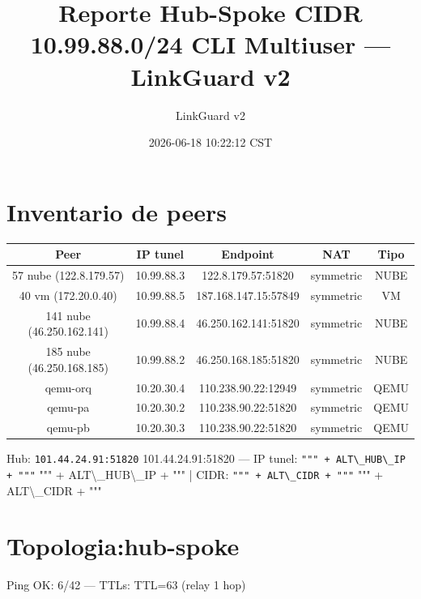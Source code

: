 \documentclass[11pt,a4paper]{article}
\title{Reporte Hub-Spoke CIDR 10.99.88.0/24 CLI Multiuser — LinkGuard v2}
\author{LinkGuard v2}
\date{2026-06-18 10:22:12 CST}
\begin{document}
\maketitle

\section{Inventario de peers}
\begin{longtable}{|c|c|c|c|c|}
\hline
Peer & IP tunel & Endpoint & NAT & Tipo \\ \hline
57 nube (122.8.179.57) & 10.99.88.3 & 122.8.179.57:51820 & symmetric & NUBE \\ \hline
40 vm (172.20.0.40) & 10.99.88.5 & 187.168.147.15:57849 & symmetric & VM \\ \hline
141 nube (46.250.162.141) & 10.99.88.4 & 46.250.162.141:51820 & symmetric & NUBE \\ \hline
185 nube (46.250.168.185) & 10.99.88.2 & 46.250.168.185:51820 & symmetric & NUBE \\ \hline
qemu-orq & 10.20.30.4 & 110.238.90.22:12949 & symmetric & QEMU \\ \hline
qemu-pa & 10.20.30.2 & 110.238.90.22:51820 & symmetric & QEMU \\ \hline
qemu-pb & 10.20.30.3 & 110.238.90.22:51820 & symmetric & QEMU \\ \hline
\end{longtable}

Hub:  \texttt{101.44.24.91:51820} 101.44.24.91:51820  — IP tunel:  \texttt{""" + ALT\textbackslash{}_HUB\textbackslash{}_IP + """} """ + ALT\textbackslash{}_HUB\textbackslash{}_IP + """  | CIDR:  \texttt{""" + ALT\textbackslash{}_CIDR + """} """ + ALT\textbackslash{}_CIDR + """\\

\section{Topologia:hub-spoke}
Ping OK: 6/42 — TTLs: TTL=63 (relay 1 hop)\\
\end{document}
